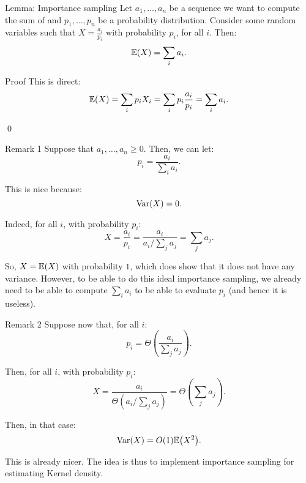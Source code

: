 \documentclass[a4paper]{article}
\begin{document}
\begin{parag}{Lemma: Importance sampling}
    Let $a_1, \ldots, a_n$ be a sequence we want to compute the sum of and $p_1, \ldots, p_n$ be a probability distribution. Consider some random variables such that $X = \frac{a_i}{p_i}$ with probability $p_i$, for all $i$. Then: 
    \[\exval\left(X\right) = \sum_{i} a_i.\]

    \begin{subparag}{Proof}
        This is direct: 
        \[\exval\left(X\right) = \sum_{i} p_i X_i = \sum_{i} p_i \frac{a_i}{p_i} = \sum_{i} a_i.\]

        \qed
    \end{subparag}
    
    \begin{subparag}{Remark 1}
        Suppose that $a_1, \ldots, a_n \geq 0$. Then, we can let: 
        \[p_i = \frac{a_i}{\sum_{i} a_i}.\]

        This is nice because: 
        \[\Var\left(X\right) = 0.\]

        Indeed, for all $i$, with probability $p_i$: 
        \[X = \frac{a_i}{p_i} = \frac{a_i}{a_i / \sum_{j} a_j} = \sum_{j} a_j.\]

        So, $X = \exval\left(X\right)$ with probability $1$, which does show that it does not have any variance. However, to be able to do this ideal importance sampling, we already need to be able to compute $\sum_{i} a_i$ to be able to evaluate $p_i$ (and hence it is useless). 
    \end{subparag}

    \begin{subparag}{Remark 2}
        Suppose now that, for all $i$: 
        \[p_i = \Theta\left(\frac{a_i}{\sum_{j} a_j}\right).\]

        Then, for all $i$, with probability $p_i$: 
        \[X =\frac{a_i}{\Theta\left(a_i / \sum_{j} a_j\right)} = \Theta\left(\sum_{j} a_j\right).\]
        
        Then, in that case: 
        \[\Var\left(X\right) = O\left(1\right) \exval\left(X^2\right).\]

        This is already nicer. The idea is thus to implement importance sampling for estimating Kernel density.
    \end{subparag}
\end{parag}
\end{document}
